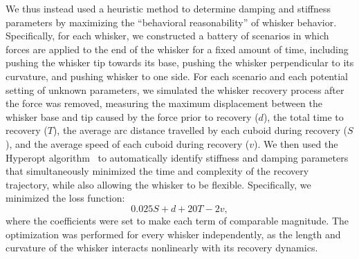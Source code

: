 We thus instead used a heuristic method to determine damping and stiffness parameters by maximizing the ``behavioral reasonability'' of whisker behavior. 
Specifically, for each whisker, we constructed a battery of scenarios in which forces are applied to the end of the whisker for a fixed amount of time, including pushing the whisker tip towards its base, pushing the whisker perpendicular to its curvature, and pushing whisker to one side.  
For each scenario and each potential setting of unknown parameters, we simulated the whisker recovery process after the force was removed, measuring the maximum displacement between the whisker base and tip caused by the force prior to recovery ($d$), the total time to recovery ($T$), the average arc distance travelled by each cuboid during recovery ($S$), and the average speed of each cuboid during recovery ($v$).    
We then used the Hyperopt algorithm~\cite{bergstra2013hyperopt} to automatically identify stiffness and damping parameters that simultaneously minimized the time and complexity of the recovery trajectory, while also allowing the whisker to be flexible.   
Specifically, we minimized the loss function:
   $$0.025S + d + 20T - 2v,$$ 
where the coefficients were set to make each term of comparable magnitude.   
The optimization was performed for every whisker independently, as the length and curvature of the whisker interacts nonlinearly with its recovery dynamics.   



